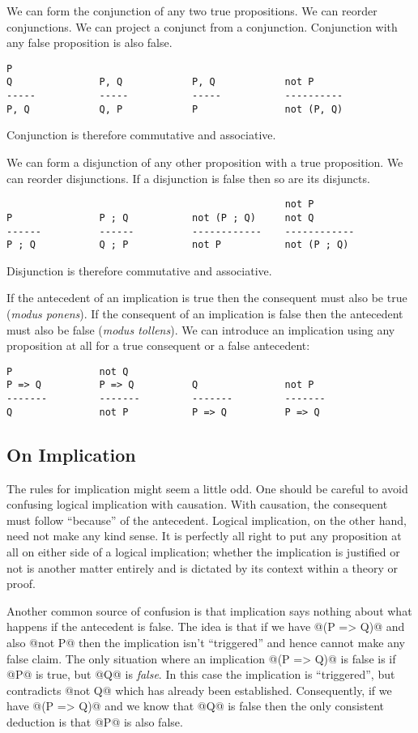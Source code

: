 We can form the conjunction of any two true propositions.
We can reorder conjunctions.
We can project a conjunct from a conjunction.
Conjunction with any false proposition is also false.
\begin{verbatim}
P
Q               P, Q            P, Q            not P
-----           -----           -----           ----------
P, Q            Q, P            P               not (P, Q)
\end{verbatim}
Conjunction is therefore commutative and associative.

We can form a disjunction of any other proposition with a true
proposition.
We can reorder disjunctions.
If a disjunction is false then so are its disjuncts.
\begin{verbatim}
                                                not P
P               P ; Q           not (P ; Q)     not Q
------          ------          ------------    ------------
P ; Q           Q ; P           not P           not (P ; Q)
\end{verbatim}
Disjunction is therefore commutative and associative.

If the antecedent of an implication is true then the consequent must
also be true (\emph{modus ponens}).
If the consequent of an implication is false then the antecedent must
also be false (\emph{modus tollens}).
We can introduce an implication using any proposition at all for a true
consequent or a false antecedent:
\begin{verbatim}
P               not Q
P => Q          P => Q          Q               not P
-------         -------         -------         -------
Q               not P           P => Q          P => Q
\end{verbatim}

\subsection{On Implication}

The rules for implication might seem a little odd.  One should be
careful to avoid confusing logical implication with causation.  With
causation, the consequent must follow ``because'' of the antecedent.
Logical implication, on the other hand, need not make any kind sense.
It is perfectly all right to put any proposition at all on either side
of a logical implication; whether the implication is justified or not is
another matter entirely and is dictated by its context within a theory
or proof.

Another common source of confusion is that implication says nothing
about what happens if the antecedent is false.  The idea is that if we
have @(P => Q)@ and also @not P@ then the implication isn't
``triggered'' and hence cannot make any false claim.  The only situation
where an implication @(P => Q)@ is false is if @P@ is true, but @Q@ is
\emph{false}.  In this case the implication is ``triggered'', but
contradicts @not Q@ which has already been established.  Consequently,
if we have @(P => Q)@ and we know that @Q@ is false then the only
consistent deduction is that @P@ is also false.

